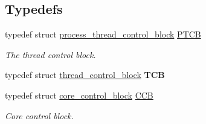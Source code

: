 \subsection*{Typedefs}
\begin{DoxyCompactItemize}
\item 
typedef struct \hyperlink{structprocess__thread__control__block}{process\+\_\+thread\+\_\+control\+\_\+block} \hyperlink{group__scheduler_ga2115e4c199a702aaf36f4571877bf013}{P\+T\+CB}
\begin{DoxyCompactList}\small\item\em The thread control block. \end{DoxyCompactList}\item 
\mbox{\label{group__scheduler_gaf88d9c946bf70b36a1e8bc34383abfc9}} 
typedef struct \hyperlink{structthread__control__block}{thread\+\_\+control\+\_\+block} {\bfseries T\+CB}
\item 
typedef struct \hyperlink{structcore__control__block}{core\+\_\+control\+\_\+block} \hyperlink{group__scheduler_ga7485b31e0dd9fd723bc2d75fba5206a0}{C\+CB}
\begin{DoxyCompactList}\small\item\em Core control block. \end{DoxyCompactList}\end{DoxyCompactItemize}
